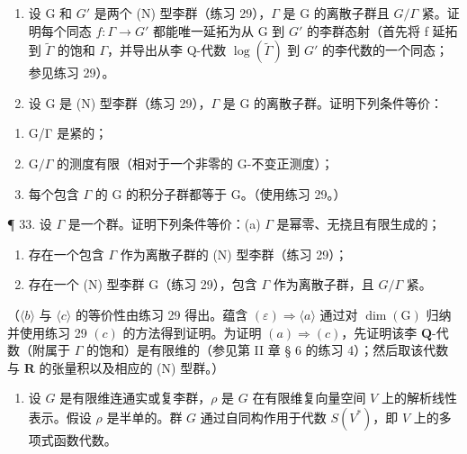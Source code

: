 \begin{enumerate}
\def\labelenumi{\arabic{enumi}.}
\setcounter{enumi}{30}
\item
  设 G 和 \(G'\) 是两个 (N) 型李群（练习 29），\(\Gamma\) 是 G 的离散子群且 \(G/\Gamma\) 紧。证明每个同态 \(f: \Gamma \to G'\) 都能唯一延拓为从 G 到 \(G'\) 的李群态射（首先将 f 延拓到 \(\tilde{\Gamma}\) 的饱和 \(\Gamma\)，并导出从李 Q-代数 \(\log(\tilde{\Gamma})\) 到 \(G'\) 的李代数的一个同态；参见练习 29）。
\item
  设 G 是 (N) 型李群（练习 29），\(\Gamma\) 是 G 的离散子群。证明下列条件等价：
\end{enumerate}

\begin{enumerate}
\def\labelenumi{(\alph{enumi})}
\item
  G/Γ 是紧的；
\item
  \(\mathrm{G} / \Gamma\) 的测度有限（相对于一个非零的 G-不变正测度）；
\item
  每个包含 \(\Gamma\) 的 G 的积分子群都等于 G。（使用练习 29。）
\end{enumerate}

¶ 33. 设 \(\Gamma\) 是一个群。证明下列条件等价：(a) \(\Gamma\) 是幂零、无挠且有限生成的；

\begin{enumerate}
\def\labelenumi{(\alph{enumi})}
\setcounter{enumi}{1}
\item
  存在一个包含 \(\Gamma\) 作为离散子群的 (N) 型李群（练习 29）；
\item
  存在一个 (N) 型李群 G（练习 29），包含 \(\Gamma\) 作为离散子群，且 \(G / \Gamma\) 紧。
\end{enumerate}

（\(\langle b\rangle\) 与 \(\langle c\rangle\) 的等价性由练习 29 得出。蕴含 \((\varepsilon)\Rightarrow \langle a\rangle\) 通过对 \(\dim (\mathrm{G})\) 归纳并使用练习 29 \((c)\) 的方法得到证明。为证明 \((a)\Rightarrow (c)\)，先证明该李 \(\mathbf{Q}\)-代数（附属于 \(\Gamma\) 的饱和）是有限维的（参见第 II 章 § 6 的练习 4）；然后取该代数与 \(\mathbf{R}\) 的张量积以及相应的 (N) 型群。）

\begin{enumerate}
\def\labelenumi{\arabic{enumi}.}
\setcounter{enumi}{33}
\tightlist
\item
  设 \(G\) 是有限维连通实或复李群，\(\rho\) 是 \(G\) 在有限维复向量空间 \(V\) 上的解析线性表示。假设 \(\rho\) 是半单的。群 \(G\) 通过自同构作用于代数 \(S(V^*)\)，即 \(V\) 上的多项式函数代数。
\end{enumerate}

